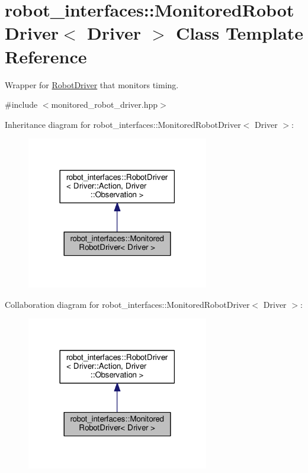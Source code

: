\hypertarget{classrobot__interfaces_1_1MonitoredRobotDriver}{}\section{robot\+\_\+interfaces\+:\+:Monitored\+Robot\+Driver$<$ Driver $>$ Class Template Reference}
\label{classrobot__interfaces_1_1MonitoredRobotDriver}


Wrapper for \hyperlink{classrobot__interfaces_1_1RobotDriver}{Robot\+Driver} that monitors timing.  




{\ttfamily \#include $<$monitored\+\_\+robot\+\_\+driver.\+hpp$>$}



Inheritance diagram for robot\+\_\+interfaces\+:\+:Monitored\+Robot\+Driver$<$ Driver $>$\+:
\nopagebreak
\begin{figure}[H]
\begin{center}
\leavevmode
\includegraphics[width=225pt]{classrobot__interfaces_1_1MonitoredRobotDriver__inherit__graph}
\end{center}
\end{figure}


Collaboration diagram for robot\+\_\+interfaces\+:\+:Monitored\+Robot\+Driver$<$ Driver $>$\+:
\nopagebreak
\begin{figure}[H]
\begin{center}
\leavevmode
\includegraphics[width=225pt]{classrobot__interfaces_1_1MonitoredRobotDriver__coll__graph}
\end{center}
\end{figure}
